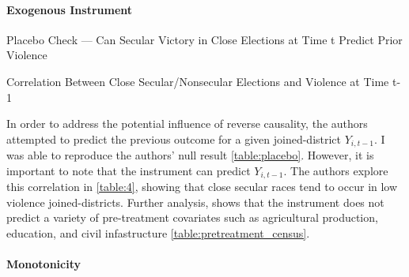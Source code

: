 \documentclass{scrartcl}
\begin{document}

\paragraph{Exogenous Instrument} \label{exo}
\begin{table}[ht]
  \begin{center}
    \scalebox{0.75}{
      
    }
    \caption{Placebo Check — Can Secular Victory in Close Elections at Time t Predict Prior Violence}
    \label{table:placebo}
  \end{center}
\end{table}
\begin{table}[ht]
  \begin{center}
    \scalebox{0.75}{
      
    }
    \caption{Correlation Between Close Secular/Nonsecular Elections and Violence at Time t-1}
    \label{table:4}
  \end{center}
\end{table}

In order to address the potential influence of reverse causality, the authors attempted to predict the previous outcome for a given joined-district $Y_{i,t-1}$.
I was able to reproduce the authors' null result \ref{table:placebo}.
However, it is important to note that the instrument can predict $Y_{i,t-1}$.
The authors explore this correlation in \ref{table:4}, showing that close secular races tend to occur in low violence joined-districts.
Further analysis, shows that the instrument does not predict a variety of pre-treatment covariates such as agricultural production, education, and civil infastructure \ref{table:pretreatment_census}.

\paragraph{Monotonicity}
\end{document}
